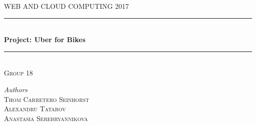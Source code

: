 \begin{titlepage} %
	\newcommand{\HRule}{\rule{\linewidth}{0.5mm}} %
	
	\center %
	
	
	\textsc{\LARGE WEB AND CLOUD COMPUTING 2017}\\[1.5cm] %
	
	
	
	
	\HRule\\[0.4cm]
	
	{\huge\bfseries Project: Uber for Bikes}\\[0.4cm] %
	
	\HRule\\[1.5cm]
	
	\textsc{\large Group 18}\\[0.5cm] %
	
	\begin{minipage}{0.6\textwidth}
		\begin{flushcenter}
			\large
			\textit{Authors}\\
			\textsc{Thom Carretero Seinhorst} \\ %
			\textsc{Alexandru Tatarov} \\%
			\textsc{Anastasia Serebryannikova} %
		\end{flushcenter}
	\end{minipage}
	~
	
	
	

\end{titlepage}
